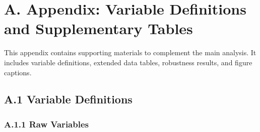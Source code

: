 \appendix

\section*{A. Appendix: Variable Definitions and Supplementary Tables}

This appendix contains supporting materials to complement the main analysis. It includes variable definitions, extended data tables, robustness results, and figure captions.

\subsection*{A.1 Variable Definitions}
\subsubsection*{A.1.1 Raw Variables}


